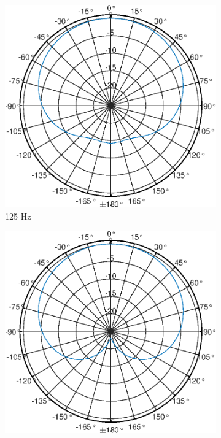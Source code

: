 \begin{figure}[b]
    \centering
    \begin{subfigure}{.33\textwidth}
        \centering
        \includegraphics[width=0.95\linewidth]{Figures/KM184_125Hz}
        \caption{125 Hz}
        \label{fig:Polar_125}
    \end{subfigure}%
    \begin{subfigure}{.33\textwidth}
        \centering
        \includegraphics[width=0.95\linewidth]{Figures/KM184_250Hz}

\end{subfigure}
\end{figure}
